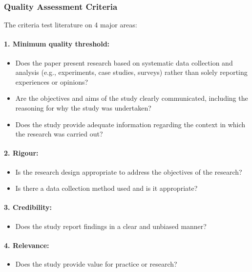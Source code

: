 \documentclass[a4paper,12pt]{article}
\begin{document}
\subsubsection{Quality Assessment Criteria}
The criteria test literature on 4 major areas:

\paragraph{1. Minimum quality threshold:}
\begin{itemize}
    \item Does the paper present research based on systematic data collection and analysis (e.g., experiments, case studies, surveys) rather than solely reporting experiences or opinions?
    \item Are the objectives and aims of the study clearly communicated, including the reasoning for why the study was undertaken?
    \item Does the study provide adequate information regarding the context in which the research was carried out?
\end{itemize}

\paragraph{2. Rigour:}
\begin{itemize}
    \item Is the research design appropriate to address the objectives of the research?
    \item Is there a data collection method used and is it appropriate?
\end{itemize}

\paragraph{3. Credibility:}
\begin{itemize}
    \item Does the study report findings in a clear and unbiased manner?
\end{itemize}

\paragraph{4. Relevance:}
\begin{itemize}
    \item Does the study provide value for practice or research?
\end{itemize}
\end{document}
